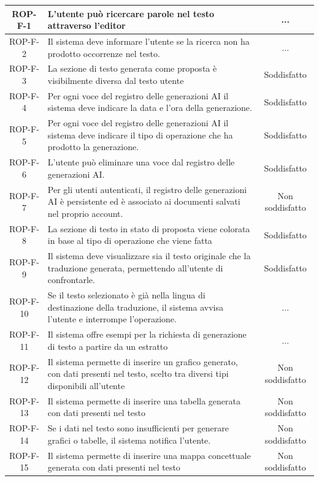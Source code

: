 \documentclass[11pt,a4paper]{article}
\begin{document}
\begin{longtable}{|c|p{11cm}|c|}
ROP-F-1 & L'utente può ricercare parole nel testo attraverso l'editor & ... \\
\hline
ROP-F-2 & Il sistema deve informare l'utente se la ricerca non ha prodotto occorrenze nel testo. & ... \\
\hline
ROP-F-3 & La sezione di testo generata come proposta è visibilmente diversa dal testo utente & Soddisfatto \\
\hline
ROP-F-4 & Per ogni voce del registro delle generazioni AI il sistema deve indicare la data e l'ora della generazione. & Soddisfatto \\
\hline
ROP-F-5 & Per ogni voce del registro delle generazioni AI il sistema deve indicare il tipo di operazione che ha prodotto la generazione. & Soddisfatto \\
\hline
ROP-F-6 & L'utente può eliminare una voce dal registro delle generazioni AI. & Soddisfatto \\
\hline
ROP-F-7 & Per gli utenti autenticati, il registro delle generazioni AI è persistente ed è associato ai documenti salvati nel proprio account. & Non soddisfatto \\
\hline
ROP-F-8 & La sezione di testo in stato di proposta viene colorata in base al tipo di operazione che viene fatta & Soddisfatto \\
\hline
ROP-F-9 & Il sistema deve visualizzare sia il testo originale che la traduzione generata, permettendo all'utente di confrontarle. & Soddisfatto \\
\hline
ROP-F-10 & Se il testo selezionato è già nella lingua di destinazione della traduzione, il sistema avvisa l'utente e interrompe l'operazione. & ... \\
\hline
ROP-F-11 & Il sistema offre esempi per la richiesta di generazione di testo a partire da un estratto & ... \\
\hline
ROP-F-12 & Il sistema permette di inserire un grafico generato, con dati presenti nel testo, scelto tra diversi tipi disponibili all'utente & Non soddisfatto \\
\hline
ROP-F-13 & Il sistema permette di inserire una tabella generata con dati presenti nel testo & Non soddisfatto \\
\hline
ROP-F-14 & Se i dati nel testo sono insufficienti per generare grafici o tabelle, il sistema notifica l'utente. & Non soddisfatto \\
\hline
ROP-F-15 & Il sistema permette di inserire una mappa concettuale generata con dati presenti nel testo & Non soddisfatto \\

\end{longtable}
\end{document}
